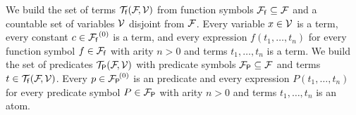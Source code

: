 
\begin{definition}
	We build the set of {\myem terms }${{\mathcal T}_{\mathsf f}({\mathcal F}\!,{\mathcal V})}$ 
	from function symbols ${{\mathcal F}_{\mathsf f}} \subseteq {\mathcal F}$ and a
	countable set of {\myem variables }${\mathcal V}$ disjoint from ${\mathcal F}$\!.
	Every variable $x\in{\mathcal V}$ is a term,
	every constant $c\in{{\mathcal F}_{\mathsf f}}^{(0)}$ is a term, 
	and every expression $f(t_1,\ldots,t_n)$
	for every function symbol $f\in{{\mathcal F}_{\mathsf f}}$ 
	with arity $n>0$ 
	and terms $t_1,\ldots,t_n$
	is a term.
%	
	We build the set of {\myem predicates} ${{\mathcal T}_{\mathsf P}({\mathcal F}\!,{\mathcal V})}$
	with predicate symbols ${{\mathcal F}_{\mathsf P}} \subseteq {\mathcal F}$ and terms $t\in{{\mathcal T}_{\mathsf f}({\mathcal F}\!,{\mathcal V})}$. 
	Every $p\in{{\mathcal F}_{\mathsf P}}^{\!(0)}$ is an predicate 
	and every expression $P(t_1,\ldots,t_n)$
	for every predicate symbol $P\in{{\mathcal F}_{\mathsf P}}$ with arity $n>0$ and terms $t_1,\ldots,t_n$ is an atom.
%
\end{definition}

